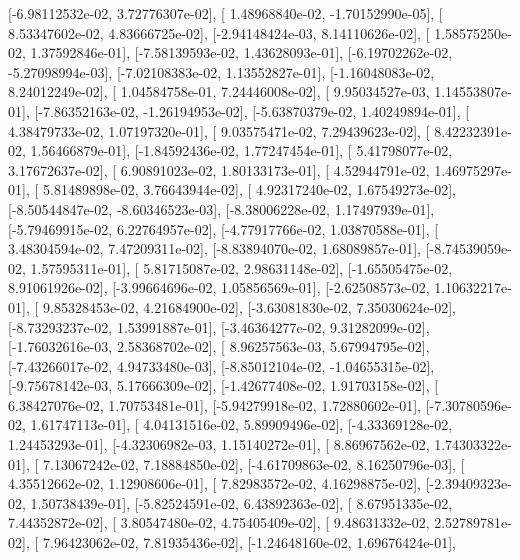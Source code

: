\documentclass{article}
\begin{document}
       [-6.98112532e-02,  3.72776307e-02],
       [ 1.48968840e-02, -1.70152990e-05],
       [ 8.53347602e-02,  4.83666725e-02],
       [-2.94148424e-03,  8.14110626e-02],
       [ 1.58575250e-02,  1.37592846e-01],
       [-7.58139593e-02,  1.43628093e-01],
       [-6.19702262e-02, -5.27098994e-03],
       [-7.02108383e-02,  1.13552827e-01],
       [-1.16048083e-02,  8.24012249e-02],
       [ 1.04584758e-01,  7.24446008e-02],
       [ 9.95034527e-03,  1.14553807e-01],
       [-7.86352163e-02, -1.26194953e-02],
       [-5.63870379e-02,  1.40249894e-01],
       [ 4.38479733e-02,  1.07197320e-01],
       [ 9.03575471e-02,  7.29439623e-02],
       [ 8.42232391e-02,  1.56466879e-01],
       [-1.84592436e-02,  1.77247454e-01],
       [ 5.41798077e-02,  3.17672637e-02],
       [ 6.90891023e-02,  1.80133173e-01],
       [ 4.52944791e-02,  1.46975297e-01],
       [ 5.81489898e-02,  3.76643944e-02],
       [ 4.92317240e-02,  1.67549273e-02],
       [-8.50544847e-02, -8.60346523e-03],
       [-8.38006228e-02,  1.17497939e-01],
       [-5.79469915e-02,  6.22764957e-02],
       [-4.77917766e-02,  1.03870588e-01],
       [ 3.48304594e-02,  7.47209311e-02],
       [-8.83894070e-02,  1.68089857e-01],
       [-8.74539059e-02,  1.57595311e-01],
       [ 5.81715087e-02,  2.98631148e-02],
       [-1.65505475e-02,  8.91061926e-02],
       [-3.99664696e-02,  1.05856569e-01],
       [-2.62508573e-02,  1.10632217e-01],
       [ 9.85328453e-02,  4.21684900e-02],
       [-3.63081830e-02,  7.35030624e-02],
       [-8.73293237e-02,  1.53991887e-01],
       [-3.46364277e-02,  9.31282099e-02],
       [-1.76032616e-03,  2.58368702e-02],
       [ 8.96257563e-03,  5.67994795e-02],
       [-7.43266017e-02,  4.94733480e-03],
       [-8.85012104e-02, -1.04655315e-02],
       [-9.75678142e-03,  5.17666309e-02],
       [-1.42677408e-02,  1.91703158e-02],
       [ 6.38427076e-02,  1.70753481e-01],
       [-5.94279918e-02,  1.72880602e-01],
       [-7.30780596e-02,  1.61747113e-01],
       [ 4.04131516e-02,  5.89909496e-02],
       [-4.33369128e-02,  1.24453293e-01],
       [-4.32306982e-03,  1.15140272e-01],
       [ 8.86967562e-02,  1.74303322e-01],
       [ 7.13067242e-02,  7.18884850e-02],
       [-4.61709863e-02,  8.16250796e-03],
       [ 4.35512662e-02,  1.12908606e-01],
       [ 7.82983572e-02,  4.16298875e-02],
       [-2.39409323e-02,  1.50738439e-01],
       [-5.82524591e-02,  6.43892363e-02],
       [ 8.67951335e-02,  7.44352872e-02],
       [ 3.80547480e-02,  4.75405409e-02],
       [ 9.48631332e-02,  2.52789781e-02],
       [ 7.96423062e-02,  7.81935436e-02],
       [-1.24648160e-02,  1.69676424e-01],
\end{document}
